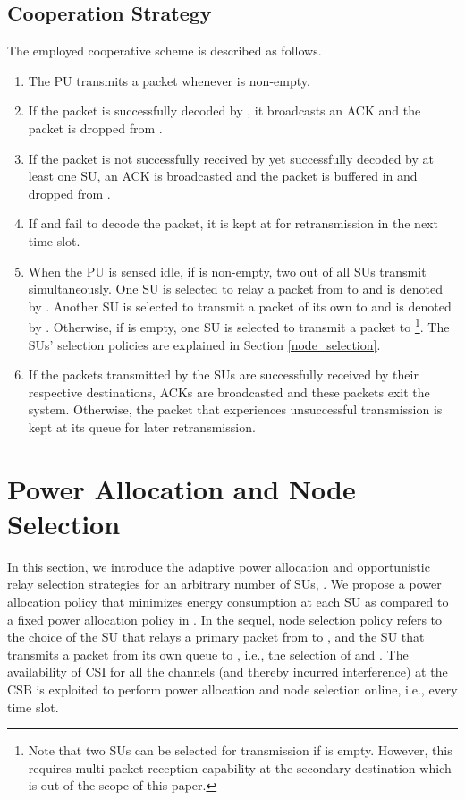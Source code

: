 \documentclass[journal,twocolumn]{IEEEtran}
\begin{document}
\subsection{Cooperation Strategy}\label{cooperation strategy}
The employed cooperative scheme is described as follows.
\begin{enumerate}
\item The PU transmits a packet whenever  is non-empty.

\item If the packet is successfully decoded by , it broadcasts an ACK and the packet is dropped from .

\item If the packet is not successfully received by  yet successfully decoded by at least one SU, an ACK is broadcasted and the packet is buffered in  and dropped from .

\item If  and  fail to decode the packet, it is kept at  for retransmission in the next time slot.

\item When the PU is sensed idle, if  is non-empty, two out of all SUs transmit simultaneously. One SU is selected to relay a packet from  to  and is denoted by . Another SU is selected to transmit a packet of its own to  and is denoted by . Otherwise, if  is empty, one SU is selected to transmit a packet to \footnote{Note that two SUs can be selected for transmission if  is empty. However, this requires multi-packet reception capability at the secondary destination which is out of the scope of this paper.}. The SUs' selection policies are explained in Section \ref{node_selection}.  

\item If the packets transmitted by the SUs are successfully received by their respective destinations, ACKs are broadcasted and these packets
    exit the system. Otherwise, the packet that experiences unsuccessful transmission is kept at its queue for later retransmission.

\end{enumerate}


\section{Power Allocation and Node Selection}\label{CS_PA}
In this section, we introduce the adaptive power allocation and opportunistic relay selection strategies for an arbitrary number of SUs, . We propose a power allocation policy
that minimizes energy consumption at each SU as compared to a fixed power allocation policy in \cite{Krikidis}.
In the sequel, node selection policy refers to the choice of the SU that relays a primary packet from  to , and the SU that transmits a packet from its own queue to , i.e., the selection of  and . The availability of CSI for all the channels (and thereby incurred interference) at the CSB is exploited to perform power allocation and node selection online, i.e., every time slot.
\end{document}
